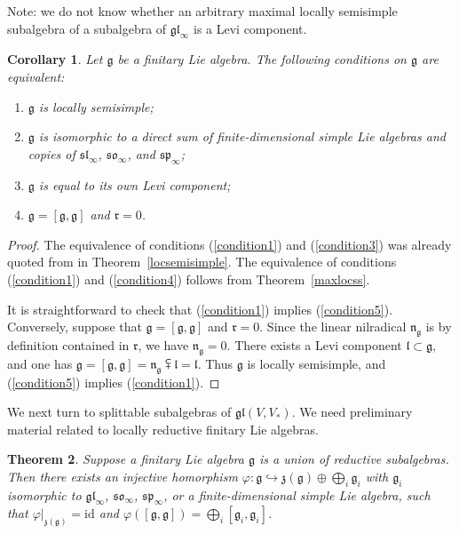 \documentclass{article}
\def\gl{\mathfrak {gl}}
\def\g{\mathfrak {g}}
\def\l{\mathfrak {l}}
\def\n{\mathfrak {n}}
\def\sl{\mathfrak{sl}}
\def\so{\mathfrak{so}}
\def\sp{\mathfrak{sp}}
\def\z{\mathfrak {z}}
\def\r{\mathfrak{r}}
\newtheorem{thm}{Theorem}[section]
\newtheorem{cor}[thm]{Corollary}
\begin{document}
Note: we do not know whether an arbitrary maximal locally semisimple subalgebra of a subalgebra of $\gl_\infty$ is a Levi component.


\begin{cor} \label{ssconditions}
Let $\g$ be a finitary Lie algebra.  The following conditions on $\g$ are equivalent:
\begin{enumerate}
\item \label{condition1} $\g$ is locally semisimple;
\item \label{condition3} $\g$ is isomorphic to a direct sum of finite-dimensional simple Lie algebras and copies of $\sl_\infty$, $\so_\infty$, and $\sp_\infty$; 
\item \label{condition4} $\g$ is equal to its own Levi component;
\item \label{condition5}  $\g = [\g,\g]$ and $\r= 0$.
\end{enumerate}
\end{cor}

\begin{proof}
The equivalence of conditions (\ref{condition1}) and (\ref{condition3}) was already quoted from \cite{DP4} in Theorem~\ref{locsemisimple}.  
The equivalence of conditions (\ref{condition1}) and (\ref{condition4}) follows from Theorem~\ref{maxlocss}.

It is straightforward to check that  (\ref{condition1}) implies (\ref{condition5}).  Conversely, suppose that $\g = [\g,\g]$ and $\r= 0$.  Since the linear nilradical $\n_\g$ is by definition contained in $\r$, we have $\n_\g = 0$.    There exists a Levi component $\l \subset \g$, and one has $\g = [\g,\g] = \n_\g \subsetplus \l = \l$.  Thus $\g$ is  locally semisimple, and (\ref{condition5}) implies (\ref{condition1}).  
\end{proof}


We next turn to splittable subalgebras of $\gl(V,V_*)$.  We need preliminary material related to locally reductive finitary Lie algebras.


\begin{thm} \label{finitary}
Suppose a finitary Lie algebra $\g$ is a union of reductive subalgebras.  Then there exists an injective homorphism $\varphi \colon \g \hookrightarrow \z(\g) \oplus \bigoplus_i \g_i$ with $\g_i$ isomorphic to $\gl_\infty$, $\so_\infty$, $\sp_\infty$, or a finite-dimensional simple Lie algebra, such that $\varphi|_{\z(\g)} = \mathrm{id}$ and $\varphi([\g,\g])= \bigoplus_i[\g_i , \g_i]$.
\end{thm}
\end{document}
